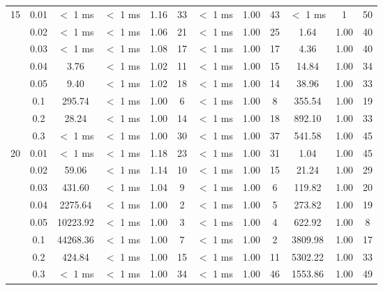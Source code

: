 \begin{tabular}{| c | c | c | c | c | c | c | c | c |  c | c | c | }
	\hline
	\multirow{8}{*}{15} & 0.01 & $<$ 1 ms & $<$ 1 ms & 1.16 & 33 & $<$ 1 ms & 1.00 & 43 & $<$ 1 ms & 1 & 50\\
	\cline{2-12}
	& 0.02 & $<$ 1 ms & $<$ 1 ms & 1.06 & 21 & $<$ 1 ms & 1.00 & 25 & 1.64 & 1.00 & 40\\
	\cline{2-12}
	& 0.03 & $<$ 1 ms & $<$ 1 ms & 1.08 & 17 & $<$ 1 ms & 1.00 & 17 & 4.36 & 1.00 & 40\\
	\cline{2-12}
	& 0.04 & 3.76 & $<$ 1 ms & 1.02 & 11 & $<$ 1 ms & 1.00 & 15 & 14.84 & 1.00 & 34\\
	\cline{2-12}
	& 0.05 & 9.40 & $<$ 1 ms & 1.02 & 18 & $<$ 1 ms & 1.00 & 14 & 38.96 & 1.00 & 33\\
	\cline{2-12}
	& 0.1 & 295.74 & $<$ 1 ms & 1.00 & 6 & $<$ 1 ms & 1.00 & 8 & 355.54 & 1.00 & 19\\
	\cline{2-12}
	& 0.2 & 28.24 & $<$ 1 ms & 1.00 & 14 & $<$ 1 ms & 1.00 & 18 & 892.10 & 1.00 & 33\\
	\cline{2-12}
	& 0.3 & $<$ 1 ms & $<$ 1 ms & 1.00 & 30 & $<$ 1 ms & 1.00 & 37 & 541.58 & 1.00 & 45\\
	\hline
	\multirow{8}{*}{20} & 0.01 & $<$ 1 ms & $<$ 1 ms & 1.18 & 23 & $<$ 1 ms & 1.00 & 31 & 1.04 & 1.00 & 45\\
	\cline{2-12}
	& 0.02 & 59.06 & $<$ 1 ms & 1.14 & 10 & $<$ 1 ms & 1.00 & 15 & 21.24 & 1.00 & 29\\
	\cline{2-12}
	& 0.03 & 431.60 & $<$ 1 ms & 1.04 & 9 & $<$ 1 ms & 1.00 & 6 & 119.82 & 1.00 & 20\\
	\cline{2-12}
	& 0.04 & 2275.64 & $<$ 1 ms & 1.00 & 2 & $<$ 1 ms & 1.00 & 5 & 273.82 & 1.00 & 19\\
	\cline{2-12}
	& 0.05 & 10223.92 & $<$ 1 ms & 1.00 & 3 & $<$ 1 ms & 1.00 & 4 & 622.92 & 1.00 & 8\\
	\cline{2-12}
	& 0.1 & 44268.36 & $<$ 1 ms & 1.00 & 7 & $<$ 1 ms & 1.00 & 2 & 3809.98 & 1.00 & 17\\
	\cline{2-12}
	& 0.2 & 424.84 & $<$ 1 ms & 1.00 & 15 & $<$ 1 ms & 1.00 & 11 & 5302.22 & 1.00 & 33\\
	\cline{2-12}
	& 0.3 & $<$ 1 ms & $<$ 1 ms & 1.00 & 34 & $<$ 1 ms & 1.00 & 46 & 1553.86 & 1.00 & 49\\
	\hline
\end{tabular}